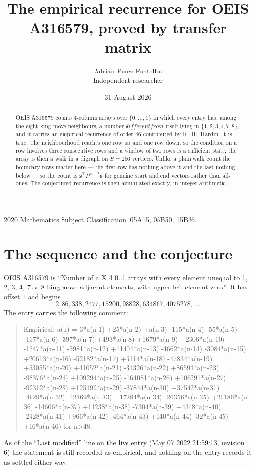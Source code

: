 \documentclass[11pt,a4paper]{article}
\title{The empirical recurrence for OEIS A316579, proved by transfer matrix}
\author{Adrian Perez Fontelles\\ \small Independent researcher}
\date{31 August 2026}
\theoremstyle{plain}
\theoremstyle{definition}
\begin{document}
\maketitle

\begin{abstract}
OEIS A316579 counts $4$-column arrays over $\{0,\dots,1\}$ in which every entry has,
among the eight king-move neighbours, a number $different from$ itself lying in $\{1,2,3,4,7,8\}$, and it carries an empirical
recurrence of order $46$ contributed by R.~H.~Hardin. It is true. The neighbourhood
reaches one row up and one row down, so the condition on a row involves three consecutive
rows and a window of two rows is a sufficient state; the array is then a walk in a digraph
on $S=256$ vertices. Unlike a plain walk count the boundary rows matter here --- the first
row has nothing above it and the last nothing below --- so the count is
$\mathbf{s}^{\!\top}P^{\,n-2}\mathbf{e}$ for genuine start and end vectors rather than
all-ones. The conjectured recurrence is then annihilated exactly, in integer arithmetic.
\end{abstract}

\noindent\small 2020 Mathematics Subject Classification. 05A15, 05B50, 15B36.\normalsize

\section{The sequence and the conjecture}

OEIS A316579 is ``Number of n X 4 0..1 arrays with every element unequal to 1, 2, 3, 4, 7 or 8 king-move adjacent elements, with upper left element zero.''. It has offset
$1$ and begins
\[
2, 86, 338, 2477, 15200, 98828, 634867, 4075278,\ \dots
\]
The entry carries the following comment:
\begin{quote}\small
Empirical: a(n) = 3*a(n-1) +25*a(n-2) +a(n-3) -115*a(n-4) -55*a(n-5) -137*a(n-6) -397*a(n-7) +493*a(n-8) +1679*a(n-9) +2306*a(n-10) -1347*a(n-11) -5981*a(n-12) +11404*a(n-13) -4662*a(n-14) -3084*a(n-15) +20613*a(n-16) -52182*a(n-17) +5114*a(n-18) -47834*a(n-19) +53055*a(n-20) +41052*a(n-21) -31326*a(n-22) +86594*a(n-23) -98376*a(n-24) +109294*a(n-25) -164081*a(n-26) +106291*a(n-27) -92312*a(n-28) +125199*a(n-29) -37844*a(n-30) +37542*a(n-31) -4929*a(n-32) -12369*a(n-33) +17284*a(n-34) -26356*a(n-35) +20186*a(n-36) -14606*a(n-37) +11238*a(n-38) -7304*a(n-39) +4348*a(n-40) -2428*a(n-41) +966*a(n-42) -464*a(n-43) +140*a(n-44) -32*a(n-45) +16*a(n-46) for n>48.
\end{quote}
As of the ``Last modified'' line on the live entry (May 07 2022 21:59:13, revision
6) the statement is still recorded as empirical, and nothing on the entry
records it as settled either way.
\end{document}
